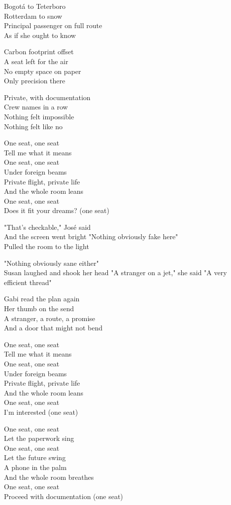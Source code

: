 \begin{lyrics}
Bogotá to Teterboro\\
Rotterdam to snow\\
Principal passenger on full route\\
As if she ought to know

Carbon footprint offset\\
A seat left for the air\\
No empty space on paper\\
Only precision there

Private, with documentation\\
Crew names in a row\\
Nothing felt impossible\\
Nothing felt like no

One seat, one seat\\
Tell me what it means\\
One seat, one seat\\
Under foreign beams\\
Private flight, private life\\
And the whole room leans\\
One seat, one seat\\
Does it fit your dreams? (one seat)

"That's checkable," José said\\
And the screen went bright
"Nothing obviously fake here"\\
Pulled the room to the light

"Nothing obviously sane either"\\
Susan laughed and shook her head
"A stranger on a jet," she said
"A very efficient thread"

Gabi read the plan again\\
Her thumb on the send\\
A stranger, a route, a promise\\
And a door that might not bend

One seat, one seat\\
Tell me what it means\\
One seat, one seat\\
Under foreign beams\\
Private flight, private life\\
And the whole room leans\\
One seat, one seat\\
I’m interested (one seat)

One seat, one seat\\
Let the paperwork sing\\
One seat, one seat\\
Let the future swing\\
A phone in the palm\\
And the whole room breathes\\
One seat, one seat\\
Proceed with documentation (one seat)
\end{lyrics}

